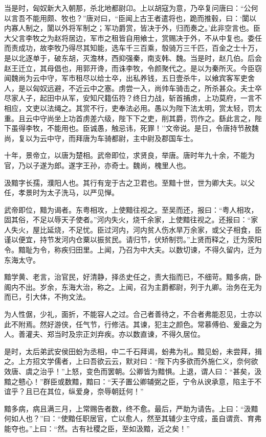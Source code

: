 \documentclass[]{article}
\begin{document}
当是时，匈奴新大入朝那，杀北地都尉卬。上以胡寇为意，乃卒复问唐曰：``公何以言吾不能用颇、牧也？''唐对曰，``臣闻上古王者遣将也，跪而推毂，曰：`闑以内寡人制之，闑以外将军制之；军功爵赏，皆决于外，归而奏之。'此非空言也。臣大父言李牧之为赵将居边，军市之租皆自用飨士，赏赐决于外，不从中复也。委任而责成功，故李牧乃得尽其知能，选车千三百乘，彀骑万三千匹，百金之士十万，是以北逐单于，破东胡，灭澹林，西抑强秦，南支韩、魏。当是时，赵几伯。后会赵王迁立，其母倡也，用郭开谗，而诛李牧，令颜聚代之。是以为秦所灭。今臣窃闻魏尚为云中守，军市租尽以给士卒，出私养钱，五日壹杀牛，以飨宾客军吏舍人，是以匈奴远避，不近云中之塞。虏尝一入，尚帅车骑击之，所杀甚众。夫士卒尽家人子，起田中从军，安知尺籍伍符？终日力战，斩首捕虏，上功莫府，一言不相应，文吏以法绳之。其赏不行，吏奉法必用。愚以为陛下法太明，赏太轻，罚太重。且云中守尚坐上功首虏差六级，陛下下之吏，削其爵，罚作之。繇此言之，陛下虽得李牧，不能用也。臣诚愚，触忌讳，死罪！''文帝说。是日，令唐持节赦魏尚，复以为云中守，而拜唐为车骑都尉，主中尉及郡国车士。

十年，景帝立，以唐为楚相。武帝即位，求贤良，举唐。唐时年九十余，不能为官，乃以子遂为郎。遂字王孙，亦奇士。魏尚，槐里人也。

汲黯字长孺，濮阳人也。其行有宠于古之卫君也。至黯十世，世为卿大夫。以父任，孝景时为太子洗马，以严见惮。

武帝即位，黯为谒者。东粤相攻，上使黯往视之。至吴而还，报曰：``粤人相攻，固其俗，不足以辱天子使者。''河内失火，烧千余家，上使黯往视之。还报曰：``家人失火，屋比延烧，不足忧。臣过河内，河内贫人伤水旱万余家，或父子相食，臣谨以便宜，持节发河内仓粟以振贫民。请归节，伏矫制罚。''上贤而释之，迁为荥阳令。黯耻为令，称疾归田里。上闻，乃召为中大夫。以数切谏，不得久留内，迁为东海太守。

黯学黄、老言，治官民，好清静，择丞史任之，责大指而已，不细苛。黯多病，卧阁内不出。岁余，东海大治，称之。上闻，召为主爵都尉，列于九卿。治务在无为而已，引大体，不拘文法。

为人性倨，少礼，面折，不能容人之过。合己者善待之，不合者弗能忍见，士亦以此不附焉。然好游侠，任气节，行修洁。其谏，犯主之颜色。常慕傅伯、爰盎之为人。善灌夫、郑当时及宗正刘弃疾。亦以数直谏，不得久居位。

是时，太后弟武安侯田蚡为丞相，中二千石拜谒，蚡弗为礼。黯见蚡，未尝拜，揖之。上方招文学儒者，上曰吾欲云云，默对曰：``陛下内多欲而外施仁义，奈何欲效唐、虞之治乎！''上怒，变色而罢朝。公卿皆为黯惧。上退，谓人曰：``甚矣，汲黯之戆心！''群臣或数黯，黯曰：``天子置公卿辅弼之臣，宁令从谀承意，陷主于不谊乎？且已在其位，纵爱身，奈辱朝廷何！''

黯多病，病且满三月，上常赐告者数，终不愈。最后，严助为请告。上曰：``汲黯何如人也？''曰：``使黯任职居官，亡以愈人，然至其辅少主守成，虽自谓贲、育弗能夺也。''上曰：``然。古有社稷之臣，至如汲黯，近之矣！''
\end{document}
